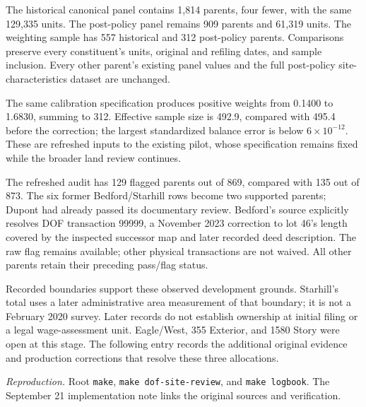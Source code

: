 The historical canonical panel contains 1,814 parents, four fewer, with the
same 129,335 units. The post-policy panel remains 909 parents and 61,319 units.
The weighting sample has 557 historical and 312 post-policy parents.
Comparisons preserve every constituent's units, original and refiling dates,
and sample inclusion. Every other parent's existing panel values and the full
post-policy site-characteristics dataset are unchanged.

The same calibration specification produces positive weights from 0.1400 to
1.6830, summing to 312. Effective sample size is 492.9, compared with 495.4
before the correction; the largest standardized balance error is below
$6 \times 10^{-12}$. These are refreshed inputs to the existing pilot, whose
specification remains fixed while the broader land review continues.

The refreshed audit has 129 flagged parents out of 869, compared with 135 out
of 873. The six former Bedford/Starhill rows become two supported parents;
Dupont had already passed its documentary review. Bedford's source explicitly
resolves DOF transaction 99999, a November 2023 correction to lot 46's length
covered by the inspected successor map and later recorded deed description.
The raw flag remains available; other physical transactions are not waived.
All other parents retain their preceding pass/flag status.

Recorded boundaries support these observed development grounds. Starhill's
total uses a later administrative area measurement of that boundary; it is
not a February 2020 survey. Later records do not establish ownership at initial
filing or a legal wage-assessment unit. Eagle/West, 355 Exterior, and 1580 Story
were open at this stage. The following entry records the additional original
evidence and production corrections that resolve these three allocations.

\textit{Reproduction.} Root \texttt{make}, \texttt{make dof-site-review}, and
\texttt{make logbook}. The September 21 implementation note links the original
sources and verification.
